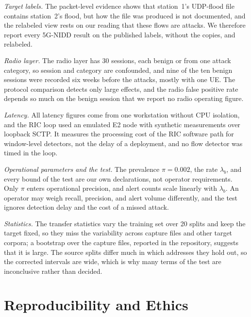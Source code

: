 \emph{Target labels.} The packet-level evidence shows that station~1's UDP-flood file contains station~2's flood, but how the file was produced is not documented, and the relabeled view rests on our reading that these flows are attacks. We therefore report every 5G-NIDD result on the published labels, without the copies, and relabeled.

\emph{Radio layer.} The radio layer has 30 sessions, each benign or from one attack category, so session and category are confounded, and nine of the ten benign sessions were recorded six weeks before the attacks, mostly with one UE. The protocol comparison detects only large effects, and the radio false positive rate depends so much on the benign session that we report no radio operating figure.

\emph{Latency.} All latency figures come from one workstation without CPU isolation, and the RIC loop used an emulated E2 node with synthetic measurements over loopback SCTP. It measures the processing cost of the RIC software path for window-level detectors, not the delay of a deployment, and no flow detector was timed in the loop.

\emph{Operational parameters and the test.} The prevalence $\pi = 0.002$, the rate $\lambda_b$, and every bound of the test are our own declarations, not operator requirements. Only $\pi$ enters operational precision, and alert counts scale linearly with $\lambda_b$. An operator may weigh recall, precision, and alert volume differently, and the test ignores detection delay and the cost of a missed attack.

\emph{Statistics.} The transfer statistics vary the training set over 20 splits and keep the target fixed, so they miss the variability across capture files and other target corpora; a bootstrap over the capture files, reported in the repository, suggests that it is large. The source splits differ much in which addresses they hold out, so the corrected intervals are wide, which is why many terms of the test are inconclusive rather than decided.

\section{Reproducibility and Ethics}
\label{sec:repro}

